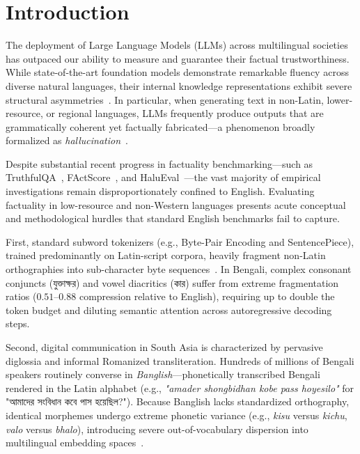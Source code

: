 \section{Introduction}
\label{sec:introduction}

The deployment of Large Language Models (LLMs) across multilingual societies has outpaced our ability to measure and guarantee their factual trustworthiness. While state-of-the-art foundation models demonstrate remarkable fluency across diverse natural languages, their internal knowledge representations exhibit severe structural asymmetries~\citep{ahuja2023mega,bang2023multitask}. In particular, when generating text in non-Latin, lower-resource, or regional languages, LLMs frequently produce outputs that are grammatically coherent yet factually fabricated---a phenomenon broadly formalized as \emph{hallucination}~\citep{maynez2020faithfulness,ji2023survey,tonmoy2024comprehensive}.

Despite substantial recent progress in factuality benchmarking---such as TruthfulQA~\citep{lin2022truthfulqa}, FActScore~\citep{min2023factscore}, and HaluEval~\citep{li2023halueval}---the vast majority of empirical investigations remain disproportionately confined to English. Evaluating factuality in low-resource and non-Western languages presents acute conceptual and methodological hurdles that standard English benchmarks fail to capture.

First, standard subword tokenizers (e.g., Byte-Pair Encoding and SentencePiece), trained predominantly on Latin-script corpora, heavily fragment non-Latin orthographies into sub-character byte sequences~\citep{hasan2023banglatokenizer}. In Bengali, complex consonant conjuncts (\foreignlanguage{bengali}{যুক্তাক্ষর}) and vowel diacritics (\foreignlanguage{bengali}{কার}) suffer from extreme fragmentation ratios ($0.51$--$0.88$ compression relative to English), requiring up to double the token budget and diluting semantic attention across autoregressive decoding steps.

Second, digital communication in South Asia is characterized by pervasive diglossia and informal Romanized transliteration. Hundreds of millions of Bengali speakers routinely converse in \emph{Banglish}---phonetically transcribed Bengali rendered in the Latin alphabet (e.g., \emph{"amader shongbidhan kobe pass hoyesilo"} for \foreignlanguage{bengali}{"আমাদের সংবিধান কবে পাস হয়েছিল?"}). Because Banglish lacks standardized orthography, identical morphemes undergo extreme phonetic variance (e.g., \emph{kisu} versus \emph{kichu}, \emph{valo} versus \emph{bhalo}), introducing severe out-of-vocabulary dispersion into multilingual embedding spaces~\citep{saha2024robustness,chowdhury20245dialects}.

